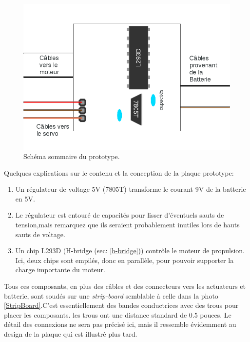 \documentclass[a4paper,11pt]{report}
\begin{document}
{\begin{figure}[h]
\centering
\includegraphics[width=1.0\textwidth]{figures/SchemaPlaqueMaison}
    \caption{\label{SchemaPlaqueMaison}Schéma sommaire du prototype.
    }
\end{figure}

Quelques explications sur le contenu et la conception de la plaque prototype:

\begin{enumerate}
	\item Un régulateur de voltage 5V (7805T) transforme le courant 9V de
          la batterie en 5V. 

	\item Le régulateur est entouré de capacités pour lisser d'éventuels
          sauts de tension,mais remarquez que ils seraient probablement
          inutiles lors de hauts sauts de voltage. 

	\item Un chip L293D (H-bridge (sec: \ref{h-bridge})) contrôle le
          moteur de propulsion. Ici, deux chips sont empilés, donc en
          parallèle, pour pouvoir supporter la charge importante du moteur. 
\end{enumerate}

Tous ces composants, en plus des câbles et des connecteurs vers les actuateurs
et batterie, sont soudés sur une \textit{strip-board} semblable à celle dans
la photo \ref{StripBoard}.C'est essentiellement des bandes conductrices avec des trous pour placer les
composants. les trous ont une distance standard de 0.5 pouces. Le détail des
connexions ne sera pas précisé ici, mais il ressemble évidemment 
au design de la plaque qui est illustré plus tard.   

}
\end{document}
